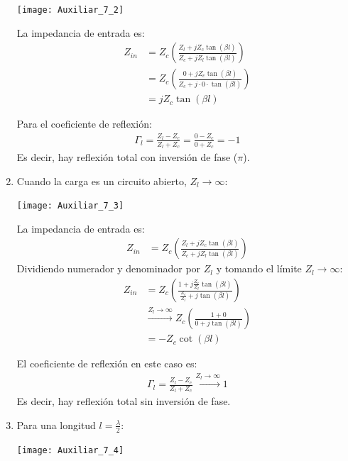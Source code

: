 \documentclass[
  11pt,
  letterpaper,
   addpoints,
   answers
  ]{exam}
\begin{document}
\begin{questions}
\begin{solution}
\begin{enumerate}
\begin{center}
    \texttt{[image: Auxiliar\_7\_2]}
\end{center}

La impedancia de entrada es:
\begin{align}
    Z_{in} &= Z_{c} \left( \frac{Z_{l} + jZ_{c} \tan(\beta l)}{Z_{c} + jZ_{l} \tan(\beta l)} \right) \\
    &= Z_{c} \left( \frac{0 + jZ_{c} \tan(\beta l)}{Z_{c} + j \cdot 0 \cdot \tan(\beta l)} \right) \\
    &= jZ_{c} \tan(\beta l)
\end{align}

Para el coeficiente de reflexión:
\begin{align}
    \Gamma_{l} = \frac{Z_{l} - Z_{c}}{Z_{l} + Z_{c}} = \frac{0 - Z_{c}}{0 + Z_{c}} = -1
\end{align}
Es decir, hay reflexión total con inversión de fase ($\pi$).


\item Cuando la carga es un circuito abierto, $Z_{l} \rightarrow \infty$:

\begin{center}
    \texttt{[image: Auxiliar\_7\_3]}
\end{center}

La impedancia de entrada es:
\begin{align}
    Z_{in} &= Z_{c} \left( \frac{Z_{l} + jZ_{c} \tan(\beta l)}{Z_{c} + jZ_{l} \tan(\beta l)} \right)
\end{align}
Dividiendo numerador y denominador por $Z_{l}$ y tomando el límite $Z_{l} \to \infty$:
\begin{align}
    Z_{in} &= Z_{c} \left( \frac{1 + j \frac{Z_{c}}{Z_{l}} \tan(\beta l)}{\frac{Z_{c}}{Z_{l}} + j \tan(\beta l)} \right) \\
    &\xrightarrow{Z_{l} \to \infty} Z_{c} \left( \frac{1 + 0}{0 + j \tan(\beta l)} \right) \\
    &= - Z_{c} \cot(\beta l)
\end{align}

El coeficiente de reflexión en este caso es:
\begin{align}
    \Gamma_{l} = \frac{Z_{l} - Z_{c}}{Z_{l} + Z_{c}} \xrightarrow{Z_{l} \to \infty} 1
\end{align}
Es decir, hay reflexión total sin inversión de fase.
\item Para una longitud $l = \frac{\lambda}{2}$:
\begin{center}
    \texttt{[image: Auxiliar\_7\_4]}
\end{center}


\end{enumerate}
\end{solution}
\end{questions}
\end{document}
